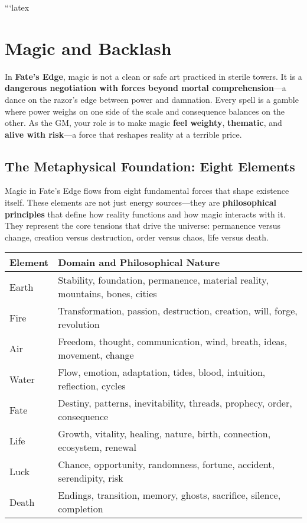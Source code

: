 ```latex
\chapter{Magic and Backlash}

In \textbf{Fate's Edge}, magic is not a clean or safe art practiced in sterile towers. It is a \textbf{dangerous negotiation with forces beyond mortal comprehension}—a dance on the razor's edge between power and damnation. Every spell is a gamble where power weighs on one side of the scale and consequence balances on the other. As the GM, your role is to make magic \textbf{feel weighty}, \textbf{thematic}, and \textbf{alive with risk}—a force that reshapes reality at a terrible price.

\section*{The Metaphysical Foundation: Eight Elements}

Magic in Fate's Edge flows from eight fundamental forces that shape existence itself. These elements are not just energy sources—they are \textbf{philosophical principles} that define how reality functions and how magic interacts with it. They represent the core tensions that drive the universe: permanence versus change, creation versus destruction, order versus chaos, life versus death.

\begin{fatebox}
\begin{tabularx}{\textwidth}{lX}
\toprule
\textbf{Element} & \textbf{Domain and Philosophical Nature} \\
\midrule
Earth & Stability, foundation, permanence, material reality, mountains, bones, cities \\
Fire & Transformation, passion, destruction, creation, will, forge, revolution \\
Air & Freedom, thought, communication, wind, breath, ideas, movement, change \\
Water & Flow, emotion, adaptation, tides, blood, intuition, reflection, cycles \\
Fate & Destiny, patterns, inevitability, threads, prophecy, order, consequence \\
Life & Growth, vitality, healing, nature, birth, connection, ecosystem, renewal \\
Luck & Chance, opportunity, randomness, fortune, accident, serendipity, risk \\
Death & Endings, transition, memory, ghosts, sacrifice, silence, completion \\
\bottomrule
\end{tabularx}
\end{fatebox}


